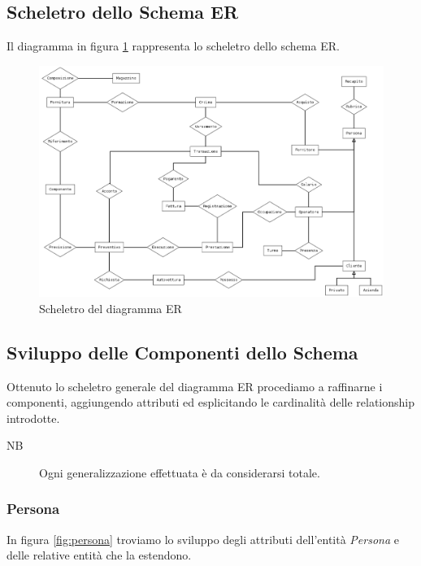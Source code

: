 	\subsection{Scheletro dello Schema ER}
	
		Il diagramma in figura \ref{fig:scheletro_er} rappresenta lo scheletro dello schema ER.
		
		\begin{figure}
			\centering
			\includegraphics[width=20cm]{images/diagrams/schema.png}
			\caption{Scheletro del diagramma ER}
			\label{fig:scheletro_er}
		\end{figure}
	
	\subsection{Sviluppo delle Componenti dello Schema}
	
		Ottenuto lo scheletro generale del diagramma ER procediamo a raffinarne i componenti, aggiungendo attributi ed esplicitando le cardinalità delle relationship introdotte.
		
		\begin{description}
			\item[NB]
				Ogni generalizzazione effettuata è da considerarsi totale.
		\end{description}
		
		\subsubsection{Persona}
		
			In figura \ref{fig:persona} troviamo lo sviluppo degli attributi dell'entità \emph{Persona} e delle relative entità che la estendono.
						
